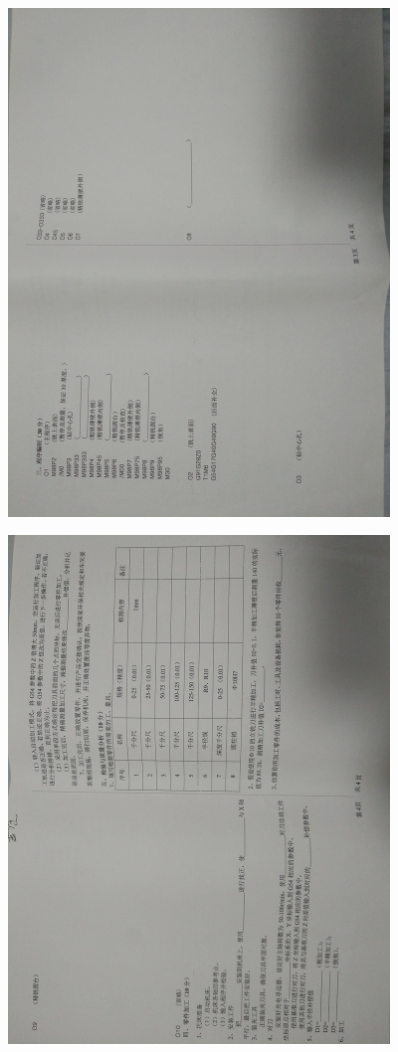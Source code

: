 \documentclass[a4paper,12pt]{article}
\numberwithin{table}{section}
\numberwithin{figure}{section}
\begin{document}
\begin{figure}[!h]
	\centering	
	\includegraphics[width=0.9\textwidth,angle=0]{images/fenshu3}
\end{figure}
\begin{figure}[!h]
	\centering	
	\includegraphics[width=0.9\textwidth,angle=0]{images/fenshu4}
\end{figure}
\end{document}
